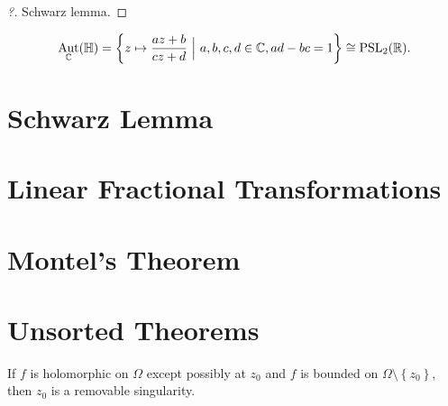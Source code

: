 \begin{proof}[?]

Schwarz lemma.

\end{proof}

\begin{theorem}[?]

\begin{align*}
\mathop{\mathrm{Aut}}_{\mathbb{C}}({\mathbb{H}}) = \left\{{ z \mapsto {az+b \over cz+d} {~\mathrel{\Big|}~}a,b,c,d\in {\mathbb{C}}, ad-bc=1 }\right\} \cong{\operatorname{PSL}}_2({\mathbb{R}})
.\end{align*}

\end{theorem}


\hypertarget{schwarz-lemma}{%
\section{Schwarz Lemma}\label{schwarz-lemma}}






\hypertarget{linear-fractional-transformations}{%
\section{Linear Fractional
Transformations}\label{linear-fractional-transformations}}

\hypertarget{montels-theorem}{%
\section{Montel's Theorem}\label{montels-theorem}}

\hypertarget{unsorted-theorems}{%
\section{Unsorted Theorems}\label{unsorted-theorems}}

\begin{theorem}

If \(f\) is holomorphic on \(\Omega\) except possibly at \(z_0\) and
\(f\) is bounded on \(\Omega\setminus\left\{{z_0}\right\}\), then
\(z_0\) is a removable singularity.

\end{theorem}

